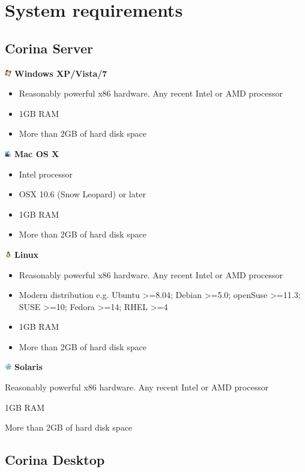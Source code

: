 \section{System requirements}

\subsection{Corina Server}
\begin{description}
\item \includegraphics[width=3mm]{Images/windows.png} \textbf{Windows XP/Vista/7} 
  \begin{itemize}
    \item Reasonably powerful x86 hardware.  Any recent Intel or AMD processor
    \item 1GB RAM
    \item More than 2GB of hard disk space
  \end{itemize}

\item \includegraphics[width=3mm]{Images/mac.png} \textbf{Mac OS X}  
  \begin{itemize}
    \item Intel processor
    \item OSX 10.6 (Snow Leopard) or later
    \item 1GB RAM
    \item More than 2GB of hard disk space
  \end{itemize}

\item \includegraphics[width=3mm]{Images/linux.png} \textbf{Linux}
  \begin{itemize}
    \item Reasonably powerful x86 hardware.  Any recent Intel or AMD processor
    \item Modern distribution e.g. Ubuntu >=8.04; Debian >=5.0; openSuse >=11.3; SUSE >=10; Fedora >=14; RHEL >=4
    \item 1GB RAM
    \item More than 2GB of hard disk space
  \end{itemize}

\item \includegraphics[width=3mm]{Images/solaris.png} \textbf{Solaris}
    \item Reasonably powerful x86 hardware.  Any recent Intel or AMD processor
    \item 1GB RAM
    \item More than 2GB of hard disk space
\end{description}


\subsection{Corina Desktop}




